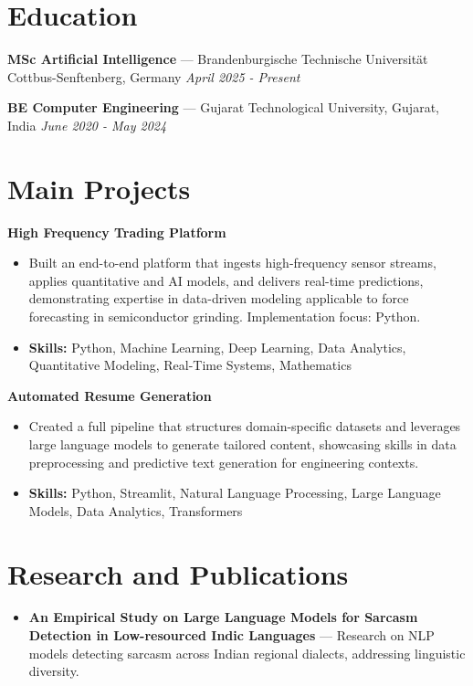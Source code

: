 \documentclass[a4paper,10pt]{article}
\begin{document}
\section*{Education}
\textbf{MSc Artificial Intelligence} — Brandenburgische Technische Universität Cottbus-Senftenberg, Germany \hfill \textit{April 2025 - Present}\par
\vspace{1.5pt}
\textbf{BE Computer Engineering} — Gujarat Technological University, Gujarat, India \hfill \textit{June 2020 - May 2024}\par

\section*{Main Projects}
\textbf{High Frequency Trading Platform}\par
\vspace{1pt}
\begin{itemize}
  \item Built an end-to-end platform that ingests high-frequency sensor streams, applies quantitative and AI models, and delivers real-time predictions, demonstrating expertise in data-driven modeling applicable to force forecasting in semiconductor grinding. Implementation focus: Python.
  \item \textbf{Skills:} Python, Machine Learning, Deep Learning, Data Analytics, Quantitative Modeling, Real-Time Systems, Mathematics
\end{itemize}
\vspace{3pt}
\textbf{Automated Resume Generation}\par
\vspace{1pt}
\begin{itemize}
  \item Created a full pipeline that structures domain-specific datasets and leverages large language models to generate tailored content, showcasing skills in data preprocessing and predictive text generation for engineering contexts.
  \item \textbf{Skills:} Python, Streamlit, Natural Language Processing, Large Language Models, Data Analytics, Transformers
\end{itemize}

\section*{Research and Publications}
\begin{itemize}
\item \textbf{An Empirical Study on Large Language Models for Sarcasm Detection in Low-resourced Indic Languages} — Research on NLP models detecting sarcasm across Indian regional dialects, addressing linguistic diversity.
\end{itemize}
\end{document}
